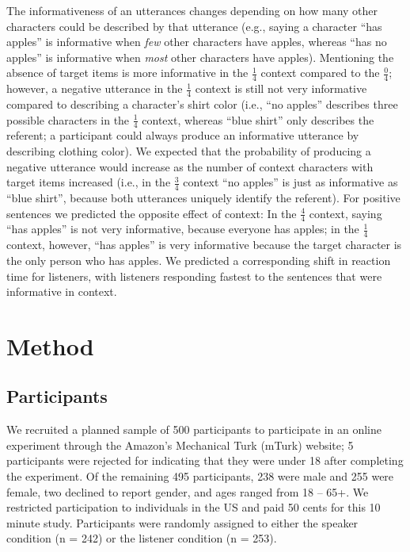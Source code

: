 \documentclass[man, noapacite]{apa2}
\begin{document}
The informativeness of an utterances changes depending on how many other characters could be described by that utterance (e.g., saying a character ``has apples'' is informative when \emph{few} other characters have apples, whereas ``has no apples'' is informative when \emph{most} other characters have apples). Mentioning the absence of target items is more informative in the $\frac{1}{4}$  context compared to the $\frac{0}{4}$;  however, a negative utterance in the $\frac{1}{4}$ context is still not very informative compared to describing a character's shirt color (i.e., ``no apples'' describes three possible characters in the $\frac{1}{4}$ context, whereas ``blue shirt'' only describes the referent; a participant could always produce an informative utterance by describing clothing color). We expected that the probability of producing a negative utterance would increase as the number of context characters with target items increased (i.e., in the $\frac{3}{4}$ context ``no apples'' is just as informative as ``blue shirt'', because both utterances uniquely identify the referent). For positive sentences we predicted the opposite effect of context: In the $\frac{4}{4}$ context, saying ``has apples'' is not very informative, because everyone has apples; in the $\frac{1}{4}$ context, however, ``has apples'' is very informative because the target character is the only person who has apples. We predicted a corresponding shift in reaction time for listeners, with listeners responding fastest to the sentences that were informative in context. 

\section{Method}

\subsection{Participants} 

We recruited a planned sample of 500 participants to participate in an online experiment through the Amazon's Mechanical Turk (mTurk) website; 5 participants were rejected for indicating that they were under 18 after completing the experiment.  Of the remaining 495 participants, 238 were male and 255 were female, two declined to report gender, and ages ranged from 18 -- 65+.  We restricted participation to individuals in the US and paid 50 cents for this 10 minute study.  Participants were randomly assigned to either the speaker condition (n = 242) or the listener condition (n = 253).
\end{document}

